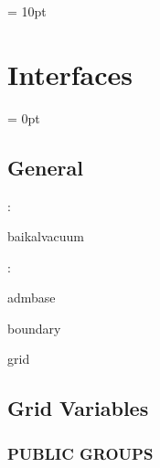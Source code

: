 \vspace{0.5cm}\parskip = 10pt 

\section{Interfaces} 


\parskip = 0pt

\vspace{3mm} \subsection*{General}

: 

baikalvacuum
\vspace{2mm}

: 

admbase

boundary

grid
\vspace{2mm}
\subsection*{Grid Variables}
\vspace{5mm}\subsubsection{PUBLIC GROUPS}

\vspace{5mm}

